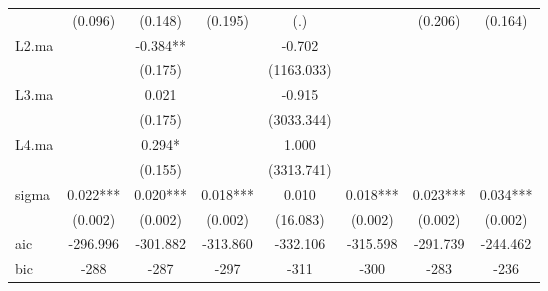 \begin{tabular}{lccccccc}
            &     (0.096)   &     (0.148)   &     (0.195)   &         (.)   &               &     (0.206)   &     (0.164)   \\
L2.ma       &               &      -0.384** &               &      -0.702   &               &               &               \\
            &               &     (0.175)   &               &  (1163.033)   &               &               &               \\
L3.ma       &               &       0.021   &               &      -0.915   &               &               &               \\
            &               &     (0.175)   &               &  (3033.344)   &               &               &               \\
L4.ma       &               &       0.294*  &               &       1.000   &               &               &               \\
            &               &     (0.155)   &               &  (3313.741)   &               &               &               \\
\midrule
sigma       &       0.022***&       0.020***&       0.018***&       0.010   &       0.018***&       0.023***&       0.034***\\
            &     (0.002)   &     (0.002)   &     (0.002)   &    (16.083)   &     (0.002)   &     (0.002)   &     (0.002)   \\
\midrule
aic         &    -296.996   &    -301.882   &    -313.860   &    -332.106   &    -315.598   &    -291.739   &    -244.462   \\
bic         &        -288   &        -287   &        -297   &        -311   &        -300   &        -283   &        -236   \\
\bottomrule \end{tabular} 
